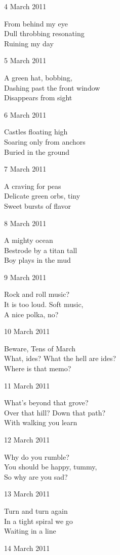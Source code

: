 \documentclass[12pt]{article}
\begin{document}
4 March 2011

From behind my eye \\
Dull throbbing resonating \\
Ruining my day

5 March 2011

A green hat, bobbing, \\
Dashing past the front window \\
Disappears from sight

6 March 2011

Castles floating high \\
Soaring only from anchors \\
Buried in the ground

7 March 2011

A craving for peas \\
Delicate green orbs, tiny \\
Sweet bursts of flavor

8 March 2011

A mighty ocean \\
Bestrode by a titan tall \\
Boy plays in the mud

9 March 2011

Rock and roll music? \\
It is too loud. Soft music, \\
A nice polka, no?

10 March 2011

Beware, Tens of March \\
What, ides? What the hell are ides? \\
Where is that memo?


\newpage

11 March 2011

What's beyond that grove? \\
Over that hill? Down that path? \\
With walking you learn

12 March 2011

Why do you rumble? \\
You should be happy, tummy, \\
So why are you sad?

13 March 2011

Turn and turn again \\
In a tight spiral we go \\
Waiting in a line

14 March 2011
\end{document}
